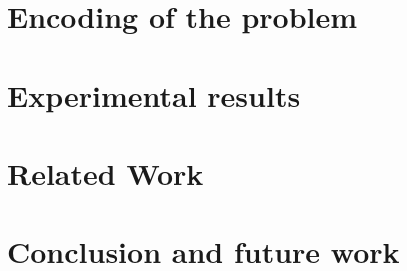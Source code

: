 \documentclass[]{llncs}
\begin{document}
\section{Encoding of the problem}
\label{sec:encoding}


\section{Experimental results}
\label{sec:experiments}


\section{Related Work}
\label{sec:related}


\section{Conclusion and future work}
\label{sec:conclusion}





\appendix
\clearpage
\end{document}
